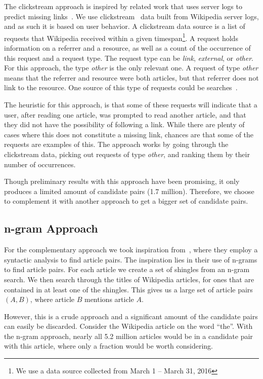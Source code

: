 The clickstream approach is inspired by related work that uses server logs to predict missing links~\cite{hyperlink-structure-using-logs}. We use clickstream~\cite{wiki-clickstream} data built from Wikipedia server logs, and as such it is based on user behavior. A clickstream data source is a list of requests that Wikipedia received within a given timespan\footnote{We use a data source collected from March 1 -- March 31, 2016}. A request holds information on a referrer and a resource, as well as a count of the occurrence of this request and a request type. The request type can be \emph{link}, \emph{external}, or \emph{other}. For this approach, the type \emph{other} is the only relevant one. A request of type \emph{other} means that the referrer and resource were both articles, but that referrer does not link to the resource. One source of this type of requests could be searches~\cite{wiki-clickstream}.

The heuristic for this approach, is that some of these requests will indicate that a user, after reading one article, was prompted to read another article, and that they did not have the possibility of following a link. While there are plenty of cases where this does not constitute a missing link, chances are that some of the requests are examples of this. The approach works by going through the clickstream data, picking out requests of type \emph{other}, and ranking them by their number of occurrences.

Though preliminary results with this approach have been promising, it only produces a limited amount of candidate pairs (1.7 million). Therefore, we choose to complement it with another approach to get a bigger set of candidate pairs.

\subsection{n-gram Approach}

For the complementary approach we took inspiration from~\cite{milne2008learning}, where they employ a syntactic analysis to find article pairs. The inspiration lies in their use of n-grams to find article pairs. For each article we create a set of shingles from an n-gram search. We then search through the titles of Wikipedia articles, for ones that are contained in at least one of the shingles. This gives us a large set of article pairs $(A,B)$, where article $B$ mentions article $A$.

However, this is a crude approach and a significant amount of the candidate pairs can easily be discarded. Consider the Wikipedia article on the word \enquote{the}. With the n-gram approach, nearly all 5.2 million articles would be in a candidate pair with this article, where only a fraction would be worth considering.


